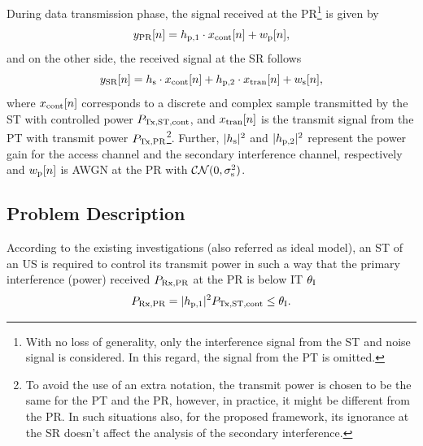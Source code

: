 During data transmission phase, the signal received at the PR\footnote{With no loss of generality, only the interference signal from the ST and noise signal is considered. In this regard, the signal from the PT is omitted.} is given by
\begin{equation}
y_{\text{PR}}[n] = h_{\text{p,1}}  \cdot x_{\text{cont}}[n] + w_{\text{p}}[n],
\label{eq:sys_mod_pr}
\end{equation}
and on the other side, the received signal at the SR follows 
\begin{equation}
y_{\text{SR}}[n] = h_{\text{s}} \cdot x_{\text{cont}}[n] + h_{\text{p,2}} \cdot x_{\text{tran}}[n] + w_{\text{s}}[n],
\label{eq:sys_mod_sr}
\end{equation}
where $x_{\text{cont}}[n]$ corresponds to a discrete and complex sample transmitted by the ST with controlled power $P_{\text{Tx,ST,cont}}$, and $x_{\text{tran}}[n]$ is the transmit signal from the PT with transmit power $P_{\text{Tx,PR}}$\footnote{To avoid the use of an extra notation, the transmit power is chosen to be the same for the PT and the PR, however, in practice, it might be different from the PR. In such situations also, for the proposed framework, its ignorance at the SR doesn't affect the analysis of the secondary interference.}. Further, $|h_{\text{s}}|^2$ and $|h_{\text{p,2}}|^2$ represent the power gain for the access channel and the secondary interference channel, respectively and $w_{\text{p}}[n]$ is AWGN at the PR with $\mathcal{CN}(0, \sigma^2_{\text{s}})$. %


\subsection{Problem Description} \label{ssec:pd}
According to the existing investigations (also referred as ideal model), an ST of an US is required to control its transmit power in such a way that the primary interference (power) received $P_{\text{Rx,PR}}$ at the PR is below IT $\theta_{\text{I}}$ \cite{Xing07}
\begin{equation}
P_{\text{Rx,PR}} = |h_{\text{p,1}}|^2 P_{\text{Tx,ST,cont}} \le \theta_{\text{I}}.
\label{eq:IT_id}
\end{equation}

